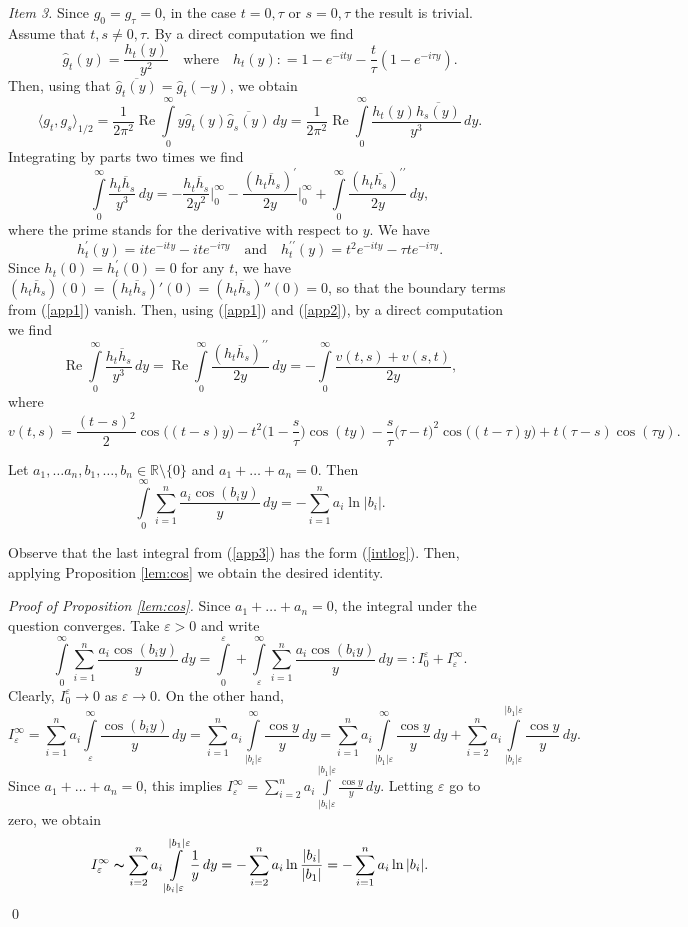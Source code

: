 \documentclass{article}
\numberwithin{equation}{section}
\newcommand{\mR}{\mathbb{R}}
\newcommand{\eps}{\varepsilon}
\newcommand{\Ree}{\operatorname{Re}}
\newcommand{\ov}{\overline}
\newcommand{\ssk}{\smallskip}
\newcommand{\ds}{\displaystyle{}}
\newcommand{\ra}{\rightarrow}
\newcommand{\ran}{\rangle}
\newcommand{\lan}{\langle}
\newcommand{\volna}{\thicksim}
\newcommand{\sm}{\setminus}
\newcommand{\fr}{\frac}
\newcommand{\qmb}{\quad\mbox}
\newcommand{\qu}{\quad}
\newcommand{\qnd}{\quad\mbox{and}\quad}
\newcommand{\sli}{\sum\limits}
\newcommand{\ili}{\int\limits}
\newcommand{\lbl}{\label}
\newcommand{\rprop}{Proposition \nolinebreak}
\newcommand{\bee}{\begin{equation}}
\newcommand{\eee}{\end{equation}}
\newcommand{\bpp}{\begin{prop}}
\newcommand{\epp}{\end{prop}}
\newcommand{\non}{\nonumber}
\begin{document}
{\it Item 3.}
Since $g_0= g_\tau = 0$, in the case $t=0,\tau$ or $s=0,\tau$
the result is trivial.
Assume that $t,s\neq 0,\tau$.
By a direct computation we find
$$
\hat g_t(y)=\fr{h_t(y)}{y^2}
\qmb{where}\qu
h_t(y): =1- e^{-ity} -\fr{t}{\tau}(1 - e^{-i\tau y}).
$$
Then, using that $\ov{\hat g_t(y)}=\hat g_t(-y)$, we obtain
\bee\non
\lan g_t,g_s\ran_{1/2}
	=\fr{1}{2\pi^2}
	 \Ree\ili_0^\infty
			y \hat g_t(y)\ov{\hat g_s(y)}\,dy
	=\fr{1}{2\pi^2}
	 \Ree\ili_0^\infty \fr{h_t(y)\ov{h_s(y)}}{y^3}\, dy.
\eee
Integrating by parts two times we find
\bee\lbl{app1}
\ili_0^\infty \fr{h_t\ov h_s}{y^3}\, dy
		=-\fr{h_t\ov h_s}{2y^2}\Big|_0^\infty
		 -\fr{(h_t\ov h_s)^\prime}{2y}\Big|_0^\infty
		 +\ili_0^\infty\fr{(h_t \ov{h_s})^{\prime\prime}}{2y} \,dy,
\eee
where the prime stands for the derivative with respect to $y$.
We have
\bee\lbl{app2}
h_t^\prime(y)=ite^{-ity} - ite^{-i\tau y}
\qnd
h_t^{\prime\prime}(y)=t^2 e^{-ity} - \tau t e^{-i\tau y}.
\eee
Since $h_t(0)=h_t^\prime(0)=0$ for any $t$,
we have
$(h_t\ov h_s)(0)=(h_t\ov h_s)'(0)=(h_t\ov h_s)''(0)=0$, so that
the boundary terms from (\ref{app1})
vanish.
Then, using (\ref{app1}) and (\ref{app2}), by a direct computation we find
\bee\lbl{app3}
\Ree\ili_0^\infty \fr{h_t\ov h_s}{y^3}\, dy
	=\Ree\ili_0^\infty\fr{(h_t \ov h_s)^{\prime\prime}}{2y} \,dy
	=-\ili_0^\infty \fr{v(t,s)+v(s,t)}{2y},
\eee
where
$$
v(t,s)
	=\fr{(t-s)^2}{2}\cos\big((t-s)y\big)
	-t^2\big(1-\fr{s}{\tau}\big)\cos(ty)
	-\fr{s}{\tau}\big(\tau-t\big)^2\cos\big((t-\tau)y\big)
  +t(\tau-s)\cos (\tau y).
$$
\bpp\lbl{lem:cos}
Let $a_1,\ldots a_n,b_1,\ldots,b_n\in\mR\sm\{0\}$ and
$a_1+\ldots+a_n=0$. Then
\bee\lbl{intlog}
\ili_0^\infty\sli_{i=1}^n\fr{a_i \cos (b_iy)}{y} \,dy=-\sli_{i=1}^n a_i\ln|b_i|.
\eee
\epp
Observe that the last integral from (\ref{app3})
has the form (\ref{intlog}).
Then, applying \rprop \ref{lem:cos} we obtain the desired identity.

\ssk
{\it Proof of \rprop\ref{lem:cos}.}
Since $a_1+\ldots+a_n=0$, the integral under the question converges.
Take $\eps>0$ and write
$$
\ili_0^\infty\sli_{i=1}^n\fr{a_i \cos (b_iy)}{y} \,dy
	=\ili_0^\eps+\ili_\eps^\infty
		\sli_{i=1}^n\fr{a_i \cos (b_iy)}{y} \,dy
	=:I_0^\eps+I^\infty_\eps.
$$
Clearly, $I_0^\eps\ra 0$ as $\eps\ra 0$.
On the other hand,
$$
I^\infty_\eps=\sli_{i=1}^n a_i \ili_{\eps}^\infty \fr{\cos (b_i y)}{y} \,dy
=\sli_{i=1}^n a_i \ili_{|b_i|\eps}^\infty \fr{\cos y}{y} \,dy
=\sli_{i=1}^n a_i \ili_{|b_1|\eps}^\infty \fr{\cos y}{y} \,dy
+\sli_{i=2}^n a_i \ili_{|b_i|\eps}^{|b_1|\eps} \fr{\cos y}{y} \,dy.
$$
Since $a_1+\ldots+a_n=0$, this implies
$
\ds{I^\infty_\eps=\sli_{i=2}^n a_i \ili_{|b_i|\eps}^{|b_1|\eps} \fr{\cos y}{y} \,dy.}
$
Letting $\eps$ go to zero, we obtain
$$
I^\infty_\eps \volna \sli_{i=2}^n a_i \ili_{|b_i|\eps}^{|b_1|\eps} \fr{1}{y} \,dy
= -\sli_{i=2}^n a_i \ln\fr{|b_i|}{|b_1|} = -\sli_{i=1}^n a_i \ln{|b_i|}.
$$
\qed
\end{document}
